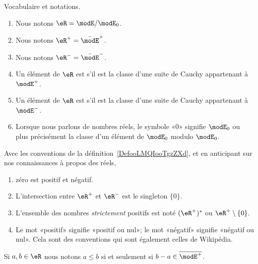 \begin{definition}        \label{DefooLMQIooTgzZXd}
    Vocabulaire et notations.
    \begin{enumerate}
        \item
            Nous notons \( \eR=\modE/\modE_0\).
        \item
            Nous notons \( \eR^+=\bar\modE^+\).
        \item
            Nous notons \( \eR^-=\bar\modE^-\).
        \item
            Un élément de \( \eR\) est  s'il est la classe d'une suite de Cauchy appartenant à \( \modE^+\).
        \item
            Un élément de \( \eR\) est  s'il est la classe d'une suite de Cauchy appartenant à \( \modE^-\).
        \item
            Lorsque nous parlons de nombres réels, le symbole «\( 0\)» signifie \( \modE_0\) ou plus précisément la classe d'un élément de \( \modE_0\) modulo \( \modE_0\).
    \end{enumerate}
\end{definition}

\begin{normaltext}\label{REMooOCXLooKQrDoq}
    Avec les conventions de la définition~\ref{DefooLMQIooTgzZXd}, et en anticipant sur nos connaissances à propos des réels,
    \begin{enumerate}
        \item
            zéro est positif et négatif.
        \item
            L'intersection entre \( \eR^+\) et \( \eR^-\) est le singleton \( \{ 0 \}\).
        \item
            L'ensemble des nombres \emph{strictement} positifs est noté \( (\eR^+)^*\) ou \( \eR^+\setminus\{ 0 \}\).
        \item
            Le mot «positif» signifie «positif ou nul»; le mot «négatif» signifie «négatif ou nul». Cela sont des conventions qui sont également celles de Wikipédia\cite{ooSBSSooTlnuKi}.
    \end{enumerate}

\end{normaltext}

\begin{definition}      \label{DEFooBXHJooOEYPRI}
    Si \( a,b\in \eR\) nous notons \( a\leq b\) si et seulement si \( b-a\in\overline{ \modE^+ }\).
\end{definition}

